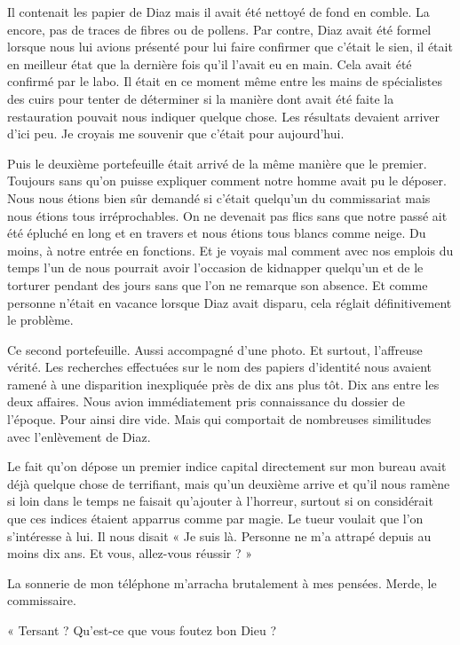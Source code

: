 Il contenait les papier de Diaz mais il avait été nettoyé de fond en comble. La encore, pas de traces de fibres ou de 
pollens. Par contre, Diaz avait été formel lorsque nous lui avions présenté pour lui faire confirmer que c'était le 
sien, il était en meilleur état que la dernière fois qu'il l'avait eu en main. Cela avait été confirmé par le labo. Il 
était en ce moment même entre les mains de spécialistes des cuirs pour tenter de déterminer si la manière dont avait été 
faite la restauration pouvait nous indiquer quelque chose. Les résultats devaient arriver d'ici peu. Je croyais me 
souvenir que c'était pour aujourd'hui.

Puis le deuxième portefeuille était arrivé de la même manière que le premier. Toujours sans qu'on puisse expliquer 
comment notre homme avait pu le déposer. Nous nous étions bien sûr demandé si c'était quelqu'un du commissariat mais 
nous étions tous irréprochables. On ne devenait pas flics sans que notre passé ait été épluché en long et en travers et 
nous étions tous blancs comme neige. Du moins, à notre entrée en fonctions. Et je voyais mal comment avec nos emplois 
du temps l'un de nous pourrait avoir l'occasion de kidnapper quelqu'un et de le torturer pendant des jours sans que 
l'on ne remarque son absence. Et comme personne n'était en vacance lorsque Diaz avait disparu, cela réglait 
définitivement le problème.

Ce second portefeuille. Aussi accompagné d'une photo. Et surtout, l'affreuse vérité. Les recherches effectuées sur le 
nom des papiers d'identité nous avaient ramené à une disparition inexpliquée près de dix ans plus tôt. Dix ans entre 
les deux affaires. Nous avion immédiatement pris connaissance du dossier de l'époque. Pour ainsi dire vide. Mais qui 
comportait de nombreuses similitudes avec l'enlèvement de Diaz.

Le fait qu'on dépose un premier indice capital directement sur mon bureau avait déjà quelque chose de terrifiant, mais 
qu'un deuxième arrive et qu'il nous ramène si loin dans le temps ne faisait qu'ajouter à l'horreur, surtout si on 
considérait que ces indices étaient apparrus comme par magie. Le tueur voulait que l'on s'intéresse à lui. Il nous 
disait « Je suis là. Personne ne m'a attrapé depuis au moins dix ans. Et vous, allez-vous réussir ? »

La sonnerie de mon téléphone m'arracha brutalement à mes pensées. Merde, le commissaire.

« Tersant ? Qu'est-ce que vous foutez bon Dieu ?

